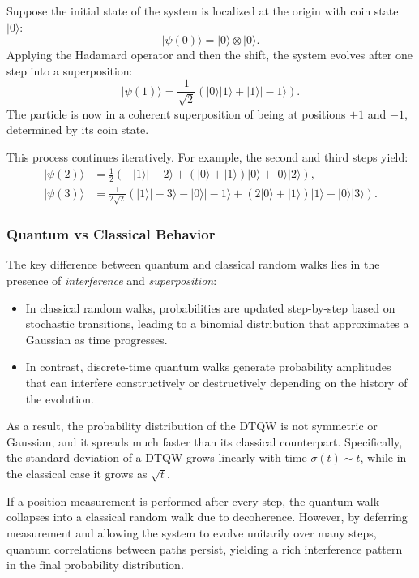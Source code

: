 \documentclass[11pt]{article}
\theoremstyle{definition}
\begin{document}
Suppose the initial state of the system is localized at the origin with coin state \( |0\rangle \):
\[
|\psi(0)\rangle = |0\rangle \otimes |0\rangle.
\]
Applying the Hadamard operator and then the shift, the system evolves after one step into a superposition:
\[
|\psi(1)\rangle = \frac{1}{\sqrt{2}} \left( |0\rangle|1\rangle + |1\rangle|-1\rangle \right).
\]
The particle is now in a coherent superposition of being at positions \( +1 \) and \( -1 \), determined by its coin state.

This process continues iteratively. For example, the second and third steps yield:
\begin{align*}
|\psi(2)\rangle &= \frac{1}{2} \left( -|1\rangle|-2\rangle + (|0\rangle + |1\rangle)|0\rangle + |0\rangle|2\rangle \right), \\
|\psi(3)\rangle &= \frac{1}{2\sqrt{2}} \left( |1\rangle|-3\rangle - |0\rangle|-1\rangle + (2|0\rangle + |1\rangle)|1\rangle + |0\rangle|3\rangle \right).
\end{align*}

\subsubsection*{Quantum vs Classical Behavior}

The key difference between quantum and classical random walks lies in the presence of \textit{interference} and \textit{superposition}:
\begin{itemize}
    \item In classical random walks, probabilities are updated step-by-step based on stochastic transitions, leading to a binomial distribution that approximates a Gaussian as time progresses.
    \item In contrast, discrete-time quantum walks generate probability amplitudes that can interfere constructively or destructively depending on the history of the evolution.
\end{itemize}

As a result, the probability distribution of the DTQW is not symmetric or Gaussian, and it spreads much faster than its classical counterpart. Specifically, the standard deviation of a DTQW grows linearly with time \( \sigma(t) \sim t \), while in the classical case it grows as \( \sqrt{t} \).


If a position measurement is performed after every step, the quantum walk collapses into a classical random walk due to decoherence. However, by deferring measurement and allowing the system to evolve unitarily over many steps, quantum correlations between paths persist, yielding a rich interference pattern in the final probability distribution.
\end{document}
